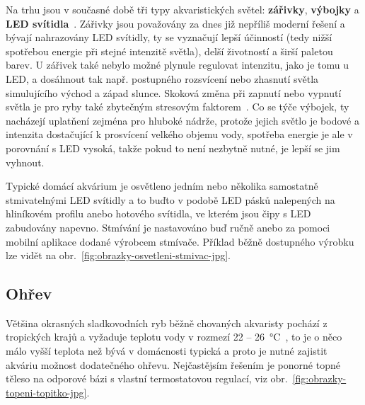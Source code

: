         Na trhu jsou v současné době tři typy akvaristických světel: \textbf{zářivky}, \textbf{výbojky}  a \textbf{LED svítidla}~\cite{eshop-rostlinna-akvaria-svetlo}. Zářivky jsou považovány za dnes již nepříliš moderní řešení a bývají nahrazovány LED svítidly, ty se vyznačují lepší účinností (tedy nižší spotřebou energie při stejné intenzitě světla), delší životností a širší paletou barev. U zářivek také nebylo možné plynule regulovat intenzitu, jako je tomu u LED, a dosáhnout tak např. postupného rozsvícení nebo zhasnutí světla simulujícího východ a západ slunce. Skoková změna při zapnutí nebo vypnutí světla je pro ryby také zbytečným stresovým faktorem~\cite{MusilLibor2018Isps}. Co se týče výbojek, ty nacházejí uplatňení zejména pro hluboké nádrže, protože jejich světlo je bodové a intenzita dostačující k prosvícení velkého objemu vody, spotřeba energie je ale v porovnání s LED vysoká, takže pokud to není nezbytně nutné, je lepší se jim vyhnout.   

        Typické domácí akvárium je osvětleno jedním nebo několika samostatně stmivatelnými LED svítidly a to buďto v podobě LED pásků nalepených na hliníkovém profilu anebo hotového svítidla, ve kterém jsou čipy s LED zabudovány napevno. Stmívání je nastavováno buď ručně anebo za pomoci mobilní aplikace dodané výrobcem stmívače. Příklad běžně dostupného výrobku lze vidět na obr.~\ref{fig:obrazky-osvetleni-stmivac-jpg}.

    \subsection{Ohřev}
        Většina okrasných sladkovodních ryb běžně chovaných akvaristy pochází z tropických krajů a vyžaduje teplotu vody v rozmezí 22 -- \qty{26}{\degreeCelsius}~\cite{slavotinek2014}, to je o něco málo vyšší teplota než bývá v domácnosti typická a proto je nutné zajistit akváriu možnost dodatečného ohřevu. Nejčastějsím řešením je ponorné topné těleso na odporové bázi s vlastní termostatovou regulací, viz obr.~\ref{fig:obrazky-topeni-topitko-jpg}.

